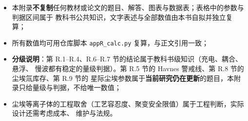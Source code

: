 \begin{itemize}
  \item 本附录\textbf{不复制}任何教材或论文的题目、解答、图表与数据表；表格中的参数与判据区间属于
        教科书公共知识，文字表述与全部数值由本书自拟并独立复算；
  \item 所有数值均可用仓库脚本 \texttt{appR\_calc.py} 复算，与正文引用一致；
  \item \textbf{分级说明}：第 R.1--R.4、R.6--R.7 节的结论属于教科书级知识（充电、耦合、悬浮、
        慢波都有稳定的量级判据）。第 R.5 节的 Havnes 警戒线、第 R.8 节的尘埃氚库存、第 R.9 节的
        星际尘埃参数属于\textbf{当前研究仍在更新}的题目，本附录只给量级与判据，不给唯一数值；
  \item 尘埃等离子体的工程取舍（工艺容忍度、聚变安全限值）属于工程判断，实际设计还需考虑成本、
        维护与法规。
\end{itemize}
\endgroup
